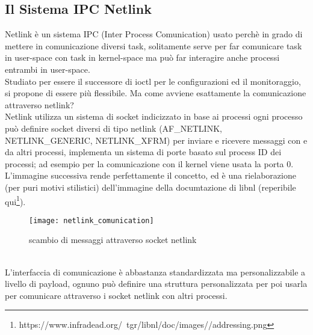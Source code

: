 \subsection{Il Sistema IPC Netlink}
Netlink \`e un sistema IPC (Inter Process Comunication) usato perch\`e in grado di mettere in comunicazione diversi task, solitamente serve per far comunicare task in user-space con task in kernel-space ma pu\`o far interagire anche processi entrambi in user-space.\\
Studiato per essere il successore di ioctl per le configurazioni ed il monitoraggio, si propone di essere pi\`u flessibile.
Ma come avviene esattamente la comunicazione attraverso netlink?\\
Netlink utilizza un sistema di socket indicizzato in base ai processi ogni processo pu\`o definire socket diversi di tipo netlink (AF\_NETLINK, NETLINK\_GENERIC, NETLINK\_XFRM) per inviare e ricevere messaggi con e da altri processi, implementa un sistema di porte basato sul process ID dei processi; ad esempio per la comunicazione con il kernel viene usata la porta 0.\\
L'immagine successiva rende perfettamente il concetto, ed \`e una rielaborazione (per puri motivi stilistici) dell'immagine della documtazione di libnl (reperibile qui\footnote{https://www.infradead.org/~tgr/libnl/doc/images//addressing.png}).
\begin{figure}[h]                       %
\begin{center}                          %
\texttt{[image: netlink\_comunication]}%
%
\caption[comunicazione netlink]{scambio di messaggi attraverso socket netlink}
\end{center}
\end{figure}\\
L'interfaccia di comunicazione \`e abbastanza standardizzata ma personalizzabile a livello di payload, ognuno pu\`o definire una struttura personalizzata per poi usarla per comunicare attraverso i socket netlink con altri processi.
